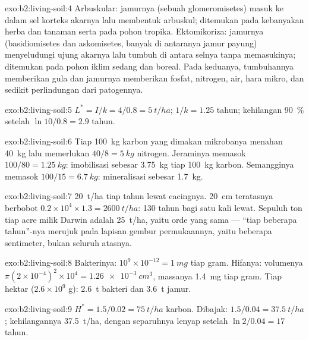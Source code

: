 \begin{solution}{exo:b2:living-soil:4}
Arbuskular: jamurnya (sebuah glomeromisetes) masuk ke dalam sel korteks
akarnya lalu membentuk arbuskul; ditemukan pada kebanyakan herba dan
tanaman serta pada pohon tropika. Ektomikoriza: jamurnya (basidiomisetes
dan askomisetes, banyak di antaranya jamur payung) menyeludungi ujung
akarnya lalu tumbuh di antara selnya tanpa memasukinya; ditemukan pada
pohon iklim sedang dan boreal. Pada keduanya, tumbuhannya memberikan
gula dan jamurnya memberikan fosfat, nitrogen, air, hara mikro, dan
sedikit perlindungan dari patogennya.
\end{solution}

\begin{solution}{exo:b2:living-soil:5}
$L^{*} = I/k = 4/0.8 = \qty{5}{t/ha}$;  $1/k = 1.25$
tahun; kehilangan \qty{90}{\%} setelah $\ln 10/0.8 = 2.9$ tahun.
\end{solution}

\begin{solution}{exo:b2:living-soil:6}
Tiap \qty{100}{kg} karbon yang dimakan mikrobanya menahan \qty{40}{kg}
lalu memerlukan $40/8 = \qty{5}{kg}$ nitrogen. Jeraminya memasok
$100/80 =
\qty{1.25}{kg}$: imobilisasi sebesar \qty{3.75}{kg} tiap
\qty{100}{kg} karbon. Semangginya memasok $100/15 = \qty{6.7}{kg}$:
mineralisasi sebesar \qty{1.7}{kg}.
\end{solution}

\begin{solution}{exo:b2:living-soil:7}
\qty{20}{t/ha}  tiap tahun lewat cacingnya. \qty{20}{cm}
teratasnya berbobot $0.2\times 10^{4}\times 1.3 = \qty{2600}{t/ha}$:
130 tahun bagi satu kali lewat. Sepuluh ton tiap acre milik Darwin
adalah \qty{25}{t/ha}, yaitu orde yang sama --- ``tiap beberapa
tahun''-nya merujuk pada lapisan gembur permukaannya, yaitu beberapa
sentimeter, bukan seluruh  atasnya.
\end{solution}

\begin{solution}{exo:b2:living-soil:8}
Bakterinya: $10^{9}\times 10^{-12} = \qty{1}{mg}$ tiap gram. Hifanya:
volumenya $\pi(2\times 10^{-4})^{2}\times 10^{4} = \qty{1.26e-3}{cm^3}$,
massanya \qty{1.4}{mg} tiap gram. Tiap hektar ($2.6\times 10^{9}$ g):
\qty{2.6}{t} bakteri dan \qty{3.6}{t} jamur.
\end{solution}

\begin{solution}{exo:b2:living-soil:9}
$H^{*} = 1.5/0.02 = \qty{75}{t/ha}$ karbon. Dibajak: $1.5/0.04
= \qty{37.5}{t/ha}$; kehilangannya \qty{37.5}{t/ha}, dengan separuhnya
lenyap setelah $\ln 2/0.04 = 17$ tahun.
\end{solution}

